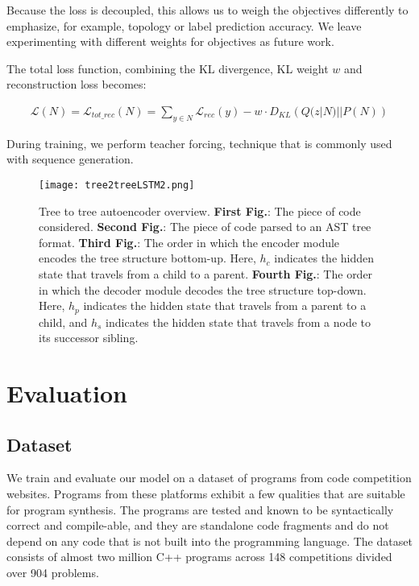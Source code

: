 Because the loss is decoupled, this allows us to weigh the objectives differently to emphasize, for example, topology or label prediction accuracy. We leave experimenting with different weights for objectives as future work. 

The total loss function, combining the KL divergence, KL weight $w$ and reconstruction loss becomes:

\begin{align}
    \mathcal{L}(N) = \mathcal{L}_{tot\_rec}(N) = \sum_{y \in N}\mathcal{L}_{rec}(y) - w \cdot D_{KL}\left(Q(z|N)||P(N)\right)
\end{align}

During training, we perform teacher forcing, technique that is commonly used with sequence generation.

\begin{figure*}[ht!]
    \centering
    \texttt{[image: tree2treeLSTM2.png]}
    \caption[Tree2Tree model high-level overview]{Tree to tree autoencoder overview. \textbf{First Fig.}: The piece of code considered. \textbf{Second Fig.}: The piece of code parsed to an AST tree format. \textbf{Third Fig.}: The order in which the encoder module encodes the tree structure bottom-up. Here, $h_c$ indicates the hidden state that travels from a child to a parent. \textbf{Fourth Fig.}: The order in which the decoder module decodes the tree structure top-down. Here, $h_p$ indicates the hidden state that travels from a parent to a child, and $h_s$ indicates the hidden state that travels from a node to its successor sibling.}
    \label{fig:tree2treeVAE}
\end{figure*}

\section{Evaluation}
\label{evaluation}

\subsection{Dataset}
We train and evaluate our model on a dataset of programs from code competition websites. Programs from these platforms exhibit a few qualities that are suitable for program synthesis. The programs are tested and known to be syntactically correct and compile-able, and they are standalone code fragments and do not depend on any code that is not built into the programming language. The dataset consists of almost two million C++ programs across 148 competitions divided over 904 problems. 

